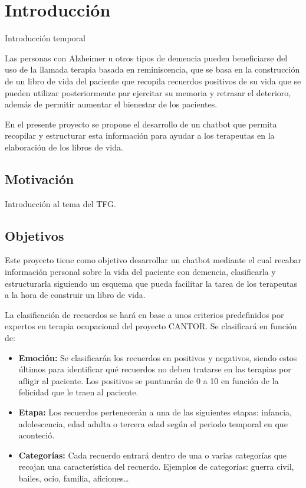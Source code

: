 \chapter{Introducción}
\label{cap:introduccion}


Introducción temporal

Las personas con Alzheimer u otros tipos de demencia pueden beneficiarse del uso de la llamada terapia basada en reminiscencia, que se basa en la construcción de un libro de vida del paciente que recopila recuerdos positivos de su vida que se pueden utilizar posteriormente par ejercitar su memoria y retrasar el deterioro, además de permitir aumentar el bienestar de los pacientes.

En el presente proyecto se propone el desarrollo de un chatbot que permita recopilar y estructurar esta información para ayudar a los terapeutas en la elaboración de los libros de vida.




\section{Motivación}
Introducción al tema del TFG.


\section{Objetivos}
Este proyecto tiene como objetivo desarrollar un chatbot mediante el cual recabar información personal sobre la vida del paciente con demencia, clasificarla y estructurarla siguiendo un esquema que pueda facilitar la tarea de los terapeutas a la hora de construir un libro de vida. 

La clasificación de recuerdos se hará en base a unos criterios predefinidos por expertos en terapia ocupacional del proyecto CANTOR. Se clasificará en función de: 

\begin{itemize}
	\item \textbf{Emoción:} Se clasificarán los recuerdos en positivos y negativos, siendo estos últimos para identificar qué recuerdos no deben tratarse en las terapias por afligir al paciente. Los positivos se puntuarán de 0 a 10 en función de la felicidad que le traen al paciente. 
	\item \textbf{Etapa:} Los recuerdos pertenecerán a una de las siguientes etapas: infancia, adolescencia, edad adulta o tercera edad según el periodo temporal en que aconteció.
	\item \textbf{Categorías:} Cada recuerdo entrará dentro de una o varias categorías que recojan una característica del recuerdo. Ejemplos de categorías: guerra civil, bailes, ocio, familia, aficiones…
\end{itemize}

